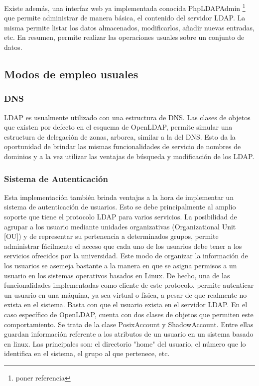 Existe además, una interfaz web ya implementada conocida PhpLDAPAdmin \footnote{ poner referencia}
que permite administrar de manera básica, el contenido del servidor LDAP. La misma permite listar
los datos almacenados, modificarlos, añadir nuevas entradas, etc. En resumen, permite realizar
las operaciones usuales sobre un conjunto de datos.

\subsection{Modos de empleo usuales}
\subsubsection{DNS}
LDAP es usualmente utilizado con una estructura de DNS. Las clases de objetos que existen por 
defecto en el esquema de OpenLDAP, permite simular una estructura de delegación de zonas, 
arborea, similar a la del DNS. Esto da la oportunidad de brindar las mismas funcionalidades 
de servicio de nombres de dominios y a la vez utilizar las ventajas de búsqueda y modificación 
de los LDAP.

\subsubsection{Sistema de Autenticación}
Esta implementación también brinda ventajas a la hora de implementar un sistema de 
autenticación de usuarios. Esto se debe principalmente al amplio soporte que tiene el protocolo 
LDAP para varios servicios. La posibilidad de agrupar a los usuario mediante unidades 
organizativas (Organizational Unit [OU]) y de representar su pertenencia a determinados 
grupos, permite administrar fácilmente el acceso que cada uno de los usuarios 
debe tener a los servicios ofrecidos por la universidad. Este modo de organizar la información 
de los usuarios se asemeja bastante a la manera en que se asigna permisos a un usuario en los 
sistemas operativos basados en Linux. De hecho, una de las funcionalidades implementadas 
como cliente de este protocolo, permite autenticar un usuario en una máquina, ya sea virtual o 
física, a pesar de que realmente no exista en el sistema. Basta con que el usuario exista en el 
servidor LDAP. En el caso específico de OpenLDAP, cuenta con dos clases de objetos que permiten
este comportamiento. Se trata de la clase PosixAccount y ShadowAccount. Entre ellas guardan 
información referente a los atributos de un usuario en un sistema basado en linux. Las principales
son: el directorio "home" del usuario, el número que lo identifica en el sistema, el grupo al que 
pertenece, etc. 


